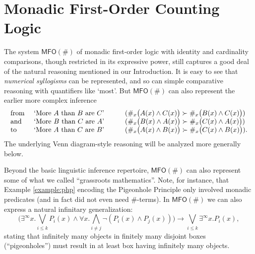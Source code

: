 \documentclass[12pt,oneside,reqno]{amsart}
\theoremstyle{definition}
\begin{document}
\section{Monadic First-Order Counting Logic} \label{section:basicmonadic} %
The system $\mathsf{MFO}(\#)$ of monadic first-order logic with identity and cardinality comparisons, though restricted in its expressive power, still captures a good deal of the natural reasoning mentioned in our Introduction. It is easy to see that \emph{numerical syllogisms} can be represented, and so can simple comparative reasoning with quantifiers like `most'. But $\mathsf{MFO}(\#)$ can also represent the earlier more complex inference
$$\begin{array}{l l l}
 \mbox{from }    & \mbox{`More }A\mbox{ than }B\mbox{ are }C\mbox{'} \quad\quad & (\#_x\big(A(x) \wedge C(x)\big) \succ \#_x \big(B(x) \wedge C(x)\big))\\
 \mbox{and}    & \mbox{`More }B\mbox{ than }C\mbox{ are }A\mbox{'} \quad\quad & (\#_x\big(B(x) \wedge A(x)\big) \succ \#_x \big(C(x) \wedge A(x)\big))\\
  \mbox{to }    & \mbox{`More }A\mbox{ than }C\mbox{ are }B\mbox{'} \quad\quad & (\#_x\big(A(x) \wedge B(x)\big) \succ \#_x \big(C(x) \wedge B(x)\big)).
\end{array}$$
The underlying Venn diagram-style reasoning will be analyzed more generally below.


Beyond the basic linguistic inference repertoire, $\mathsf{MFO}(\#)$ can also represent some of what we called ``grassroots mathematics''. Note, for instance, that Example \ref{example:php} encoding the Pigeonhole Principle only involved monadic predicates (and in fact did not even need $\#$-terms). In $\mathsf{MFO}(\#)$ we can also express a natural infinitary generalization:
 \begin{equation} \label{eq:fophpinf}\big( \exists^{\infty}x. \bigvee_{i \leq k} P_i(x) \wedge \forall x. \bigwedge_{i \neq j} \neg (P_i(x) \wedge P_j(x)) \big)\rightarrow \bigvee_{i \leq k} \exists^{\infty}x. P_i(x), \end{equation} stating that infinitely many objects in finitely many disjoint boxes (``pigeonholes'') must result in at least box  having infinitely many objects. 
\end{document}
